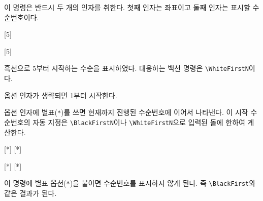 \documentclass[figtabcapt,a4paper]{oblivoir}
\begin{document}
이 명령은 반드시 두 개의 인자를 취한다. 첫째 인자는 좌표이고 둘째 인자는 표시할 수순번호이다.

\begin{boxedverbatim}
[5]
\end{boxedverbatim}

\begin{ksbadukpan}[badukpansize=7,badukpancolor=yellow!20][DL]
[5]
\end{ksbadukpan}

흑선으로 5부터 시작하는 수순을 표시하였다. 대응하는 백선 명령은 \verb|\WhiteFirstN|이다.

옵션 인자가 생략되면 1부터 시작한다.

\begin{boxedverbatim}
\end{boxedverbatim}

\begin{ksbadukpan}[badukpansize=7,badukpancolor=yellow!20][DL]
\end{ksbadukpan}

옵션 인자에 별표(\verb|*|)를 쓰면 현재까지 진행된 수순번호에 이어서 나타낸다.
이 시작 수순번호의 자동 지정은 \verb|\BlackFirstN|이나 \verb|\WhiteFirstN|으로 입력된
돌에 한하여 계산한다.

\begin{boxedverbatim}
[*]
[*]
\end{boxedverbatim}

\begin{ksbadukpan}[badukpansize=7,badukpancolor=yellow!20,posmark][UR]
[*]
[*]
\end{ksbadukpan}

이 명령에 별표 옵션(\verb|*|)을 붙이면 수순번호를 표시하지 않게 된다. 즉 \verb|\BlackFirst|와 같은 결과가 된다. 

\begin{boxedverbatim}
\end{boxedverbatim}

\begin{ksbadukpan}[badukpansize=7,badukpancolor=yellow!20][DL]
\end{ksbadukpan}
\end{document}
